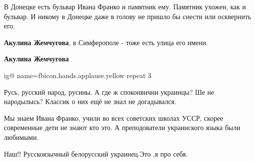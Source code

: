 \begin{itemize}
В Донецке есть бульвар Ивана Франко и памятник ему. Памятник ухожен, как и
бульвар. И никому в Донецке даже в голову не пришло бы снести или осквернить
его.

\begin{itemize}
 
\textbf{Акулина Жемчугова}, в Симферополе - тоже есть улица его имени.

 
\textbf{Акулина Жемчугова} 

\ifcmt
  ig@ name=fbicon.hands.applause.yellow 
	repeat 3
\fi

\end{itemize}

 
Русь, русский народ, русины. А где ж споконвични украинцы? Ше не народылысь? Классик о них ещё не знал не догадывался.

 

Мы знаем Ивана Франко, учили во всех советских школах УССР, скорее современные
дети не знают кто это. А преподователи украинского языка были любимыми.


 
Наш!! Русскоязычный белорусский украинец.Это ,я про себя.


\end{itemize}
